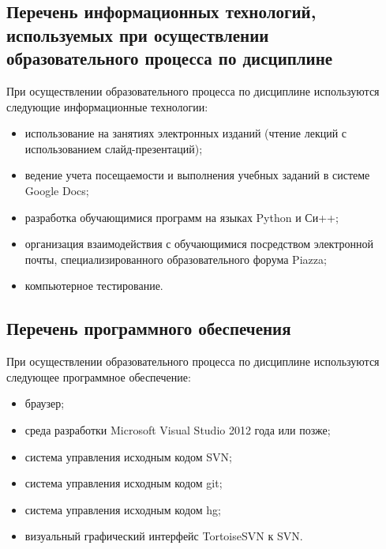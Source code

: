 \documentclass[a4paper,12pt]{article}
\begin{document}
\subsection{Перечень информационных технологий, используемых при осуществлении образовательного процесса по дисциплине}

При осуществлении образовательного процесса по дисциплине используются следующие информационные технологии:
\begin{itemize}[nolistsep]
  
\item использование на занятиях электронных изданий (чтение лекций с использованием слайд-презентаций);
  
\item ведение учета посещаемости и выполнения учебных заданий в системе Google Docs;
  
\item разработка обучающимися программ на языках Python и Си++;
  
\item организация взаимодействия с обучающимися посредством электронной почты, специализированного образовательного форума Piazza;
  
\item компьютерное тестирование.
  
\end{itemize}

\subsection{Перечень программного обеспечения}
При осуществлении образовательного процесса по дисциплине используются следующее программное обеспечение:
\begin{itemize}[nolistsep]
  
\item браузер;
  
\item среда разработки Microsoft Visual Studio 2012 года или позже;
  
\item система управления исходным кодом SVN;
  
\item система управления исходным кодом git;
  
\item система управления исходным кодом hg;
  
\item визуальный графический интерфейс TortoiseSVN к SVN.
  
\end{itemize}
\end{document}
